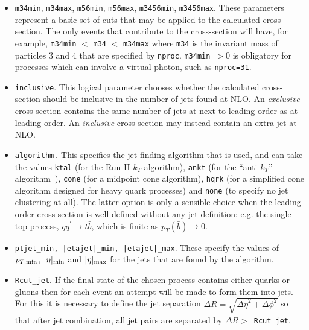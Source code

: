 \documentclass[12pt]{article}
\begin{document}
\begin{itemize}
\begin{center}
\{blank line\} \\
{\tt [Jet definition and event cuts] }
\end{center}

\item {\tt m34min}, {\tt m34max}, {\tt m56min}, {\tt m56max}, {\tt m3456min}, {\tt m3456max}.
These parameters represent a basic set of cuts that may be applied
to the calculated cross-section. The only events that contribute to
the cross-section will have, for example,
{\tt m34min} $<$ {\tt m34} $<$ {\tt m34max} where {\tt m34} is the
invariant mass of particles 3 and 4 that are specified by {\tt nproc}.
{\tt m34min}~$> 0$ is obligatory for processes which can involve a virtual
photon, such as {\tt nproc=31}.
\item {\tt inclusive}.  This logical parameter chooses whether the
calculated cross-section should be inclusive in the number of jets
found at NLO. An {\em exclusive}
cross-section contains the same number of jets at next-to-leading
order as at leading order. An {\em inclusive} cross-section may
instead contain an extra jet at NLO.

\item {\tt algorithm.} This specifies the jet-finding algorithm that
is used, and can take the values
{\tt ktal} (for the Run II $k_T$-algorithm), {\tt ankt} (for the
``anti-$k_T$'' algorithm~\cite{Cacciari:2008}), {\tt cone} (for
a midpoint cone algorithm), {\tt hqrk} (for a simplified cone
algorithm designed for heavy quark processes) and {\tt none} (to
specify no jet clustering at all). The latter option is only a
sensible choice when the leading order cross-section is well-defined
without any jet definition: e.g. the single top process,
$q{\bar q^\prime} \to t{\bar b}$, which is finite as
$p_T({\bar b}) \to 0$.

\item {\tt ptjet\_min, |etajet|\_min, |etajet|\_max}. These specify the values
of $p_{T,{\rm min}}$, $|\eta|_{\rm min}$ and $|\eta|_{\rm max}$ for the
jets that are found by the algorithm. 

\item {\tt Rcut\_jet}. If the final state of the chosen process contains
either quarks or gluons then for each event an attempt will be made
to form them into jets. For this it is necessary to define the
jet separation $\Delta R=\sqrt{{\Delta \eta}^2 + {\Delta \phi}^2}$
so that after jet combination, all jet pairs are separated by
$\Delta R >$~{\tt Rcut\_jet}.


\end{itemize}
\end{document}
